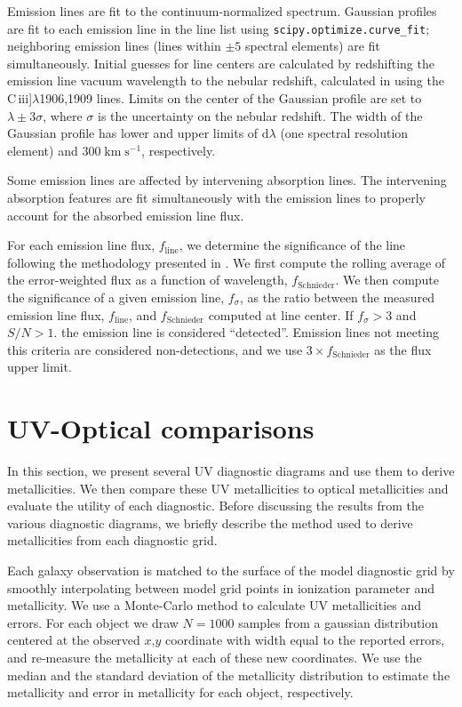 \documentclass[preprint2]{aastex62}
\newcommand{\ciii}{C\,{\sc iii}]\xspace}
\newcommand{\kms}{\ensuremath{\;\mathrm{km}\;\mathrm{s}^{-1}}\xspace}
\begin{document}
Emission lines are fit to the continuum-normalized spectrum. Gaussian profiles are fit to each emission line in the line list using {\tt scipy.optimize.curve\_fit}; neighboring emission lines (lines within $\pm 5$ spectral elements) are fit simultaneously. Initial guesses for line centers are calculated by redshifting the emission line vacuum wavelength to the nebular redshift, calculated in \citet{Rigby+2018a} using the \ciii$\lambda$1906,1909 lines. Limits on the center of the Gaussian profile are set to $\lambda \pm 3\sigma$, where $\sigma$ is the uncertainty on the nebular redshift. The width of the Gaussian profile has lower and upper limits of d$\lambda$ (one spectral resolution element) and 300\kms, respectively.

Some emission lines are affected by intervening absorption lines. The intervening absorption features are fit simultaneously with the emission lines to properly account for the absorbed emission line flux.

For each emission line flux, $f_{\mathrm{line}}$, we determine the significance of the line following the methodology presented in \citet{Schnieider+1993}. We first compute the rolling average of the error-weighted flux as a function of wavelength, $f_{\mathrm{Schnieder}}$. We then compute the significance of a given emission line, $f_{\sigma}$, as the ratio between the measured emission line flux, $f_{\mathrm{line}}$, and $f_{\mathrm{Schnieder}}$ computed at line center. If $f_{\sigma}>3$ and $S/N > 1$. the emission line is considered ``detected''. Emission lines not meeting this criteria are considered non-detections, and we use $3\times f_{\mathrm{Schnieder}}$ as the flux upper limit.

\section{UV-Optical comparisons}\label{sec:UVOpt}

In this section, we present several UV diagnostic diagrams and use them to derive metallicities. We then compare these UV metallicities to optical metallicities and evaluate the utility of each diagnostic. Before discussing the results from the various diagnostic diagrams, we briefly describe the method used to derive metallicities from each diagnostic grid. 

Each galaxy observation is matched to the surface of the model diagnostic grid by smoothly interpolating between model grid points in ionization parameter and metallicity. We use a Monte-Carlo method to calculate UV metallicities and errors. For each object we draw $N=1000$ samples from a gaussian distribution centered at the observed $x$,$y$ coordinate with width equal to the reported errors, and re-measure the metallicity at each of these new coordinates. We use the median and the standard deviation of the metallicity distribution to estimate the metallicity and error in metallicity for each object, respectively. 
\end{document}
